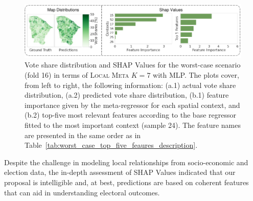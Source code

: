 \documentclass[runningheads]{llncs}
\begin{document}
\begin{figure}[!ht]
    \centering
    \includegraphics[page=2, width=\linewidth]{shap_values_lv.pdf}
    \caption{Vote share distribution and SHAP Values for the worst-case scenario (fold 16) in terms of \textsc{Local Meta $K=7$} with MLP. The plots cover, from left to right, the following information: (a.1) actual vote share distribution, (a.2) predicted vote share distribution, (b.1) feature importance given by the meta-regressor for each spatial context, and (b.2) top-five most relevant features according to the base regressor fitted to the most important context (sample 24). The feature names are presented in the same order as in Table~\ref{tab:worst_case_top_five_feaures_description}.}
    \label{fig:shap_values_worst_case}
\end{figure}

Despite the challenge in modeling local relationships from socio-economic and election data, the in-depth assessment of SHAP Values indicated that our proposal is intelligible and, at best, predictions are based on coherent features that can aid in understanding electoral outcomes.

\begin{table}[htbp]
	\centering
	\scriptsize
	\caption{Top-five features from the most important context in the worst-case scenario~(fold 16).}
	\label{tab:worst_case_top_five_feaures_description}
\end{table}
\end{document}
